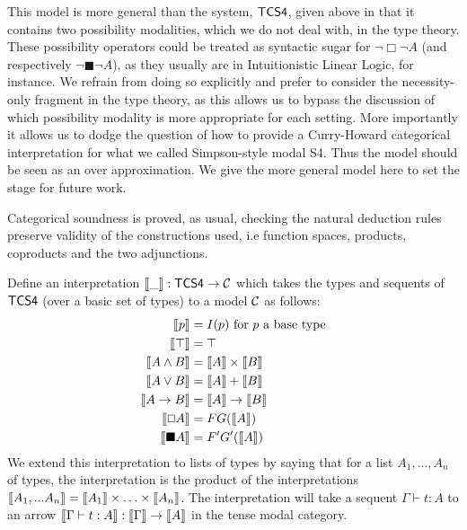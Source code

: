 This model is more general than the system, $\sf{TCS4}$, given above
in that it contains two possibility modalities, which we do not deal
with, in the type theory. These possibility operators could be treated
as syntactic sugar for $\neg \Box \neg A$ (and respectively $\neg
\blacksquare \neg A$), as they usually are in Intuitionistic Linear
Logic, for instance. We refrain from doing so explicitly and prefer to
consider the necessity-only fragment in the type theory, as this
allows us to bypass the discussion of which possibility modality is
more appropriate for each setting.  More importantly it allows us to
dodge the question of how to provide a Curry-Howard categorical
interpretation for what we called Simpson-style modal S4.  Thus the
model should be seen as an over approximation.  We give the more
general model here to set the stage for future work.

Categorical soundness is proved, as usual, checking the natural
deduction rules preserve validity of the constructions used, i.e
function spaces, products, coproducts and the two adjunctions.

Define an interpretation $\sem{\_} : \sf{TCS4} \to {\cal C}$ which
takes the types and sequents of $\sf{TCS4}$ (over a basic set of
types) to a model $\cal C$ as follows:
\begin{align*}
\sem{p} &= I(p) \mbox{  for $p$ a base type}\\
\sem{\top} &= \top\\
\sem{  A \wedge B  } &=  \sem{ A}  \times  \sem{ B }\\
\sem{  A \lor B  } &=  \sem{ A}  +  \sem{ B }\\
\sem{  A \to B  } &=  \sem{ A}  \to  \sem{ B }\\
\sem{\Box A} &= F G(\sem{A})\\
\sem{\blacksquare A} &= F' G'(\sem{A})
\end{align*}
 We extend this interpretation to lists of types by saying that for a
 list $A_1, ..., A_n$ of types, the interpretation is the product of
 the interpretations $\sem{A_1,...A_n} = \sem{A_1} \times \ldots
 \times \sem{A_n}$.  The interpretation will take a sequent $\Gamma
 \vdash t : A$ to an arrow $ \sem {\Gamma \vdash t : A} : \sem{
   \Gamma} \to \sem{A} $ in the tense modal category.

